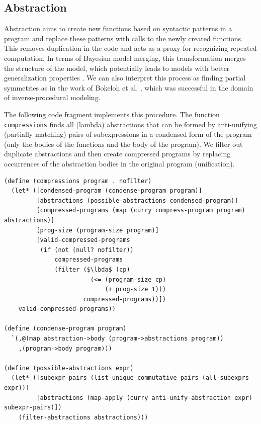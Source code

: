 \documentclass[a4paper,10pt]{article}
\newcommand{\lbda}{\color[rgb]{0,.3,.7} \lambda}
\begin{document}
\subsection{Abstraction}

Abstraction aims to create new functions based on syntactic patterns in a program and replace these patterns with calls to the newly created functions.
This removes duplication in the code and acts as a proxy for recognizing repeated computation.
In terms of Bayesian model merging, this transformation merges the structure of the model, which potentially leads to models with better generalization properties \cite{Stolcke:1994:IPG:645515.658235}. We can also interpret this process as finding partial symmetries as in the work of Bokeloh et al. \cite{DBLP:journals/tog/BokelohWS10}, which was successful in the domain of inverse-procedural modeling.

The following code fragment implements this procedure. The function \texttt{compressions} finds all (lambda) abstractions that can be formed by anti-unifying (partially matching) pairs of subexpressions in a condensed form of the program (only the bodies of the functions and the body of the program). We filter out duplicate abstractions and then create compressed programs by replacing occurrences of the abstraction bodies in the original program (unification).

\begin{lstlisting}[frame=trbl]
(define (compressions program . nofilter)
  (let* ([condensed-program (condense-program program)]
         [abstractions (possible-abstractions condensed-program)]
         [compressed-programs (map (curry compress-program program) abstractions)]
         [prog-size (program-size program)]
         [valid-compressed-programs
          (if (not (null? nofilter))
              compressed-programs
              (filter ($\lbda$ (cp)
                        (<= (program-size cp)
                            (+ prog-size 1)))
                      compressed-programs))])
    valid-compressed-programs))

(define (condense-program program)
  `(,@(map abstraction->body (program->abstractions program))
    ,(program->body program)))

(define (possible-abstractions expr)
  (let* ([subexpr-pairs (list-unique-commutative-pairs (all-subexprs expr))]
         [abstractions (map-apply (curry anti-unify-abstraction expr) subexpr-pairs)])
    (filter-abstractions abstractions)))
\end{lstlisting}
\end{document}
